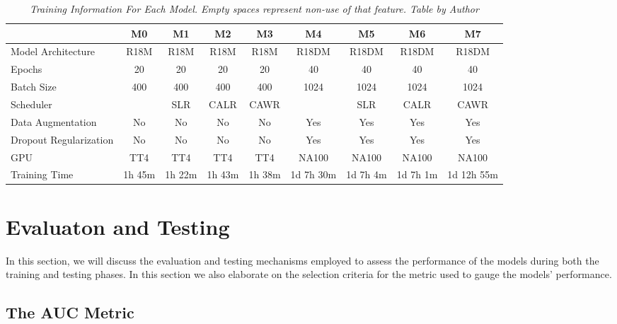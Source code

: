 \begin{landscape}

  \begin{table}
    \centering
    \begin{tabular}{lcccccccc}
      \toprule
      & \textbf{M0} & \textbf{M1} & \textbf{M2} & \textbf{M3} & \textbf{M4} & \textbf{M5} & \textbf{M6} & \textbf{M7} \\
      \midrule
      Model Architecture & R18M & R18M & R18M & R18M & R18DM & R18DM & R18DM & R18DM \\
      Epochs & 20 & 20 & 20 & 20 & 40 & 40 & 40 & 40 \\
      Batch Size & 400 & 400 & 400 & 400 & 1024 & 1024 & 1024 & 1024 \\
      Scheduler & & SLR & CALR & CAWR &  & SLR & CALR & CAWR  \\
      Data Augmentation & No & No & No & No  & Yes & Yes & Yes & Yes \\
      Dropout Regularization & No & No & No & No  & Yes & Yes & Yes & Yes \\
      GPU & TT4 & TT4 & TT4 & TT4 & NA100 & NA100 & NA100 & NA100 \\
      Training Time & 1h 45m & 1h 22m & 1h 43m & 1h 38m & 1d 7h 30m & 1d 7h 4m & 1d 7h 1m & 1d 12h 55m \\ \bottomrule
    \end{tabular}
    \caption[Training Information For Each Model.]
    {\textit{Training Information For Each Model. Empty spaces represent non-use of that feature.
    Table by Author}}
    {\label{table:trained-models-information}}
  \end{table}
\end{landscape}

\newpage

\section{Evaluaton and Testing}

In this section, we will discuss the evaluation and testing mechanisms employed
to assess the performance of the models during both the training and testing
phases. In this section we also elaborate on the selection criteria for the
metric used to gauge the models' performance.

\subsection{The AUC Metric}

